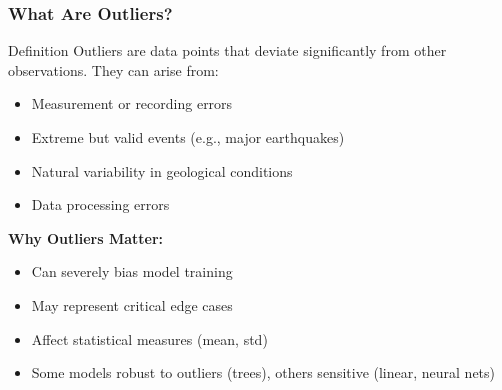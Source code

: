 \documentclass[aspectratio=169]{beamer}
\begin{document}
\begin{frame}
\frametitle{What Are Outliers?}

\begin{block}{Definition}
Outliers are data points that deviate significantly from other observations. They can arise from:
\begin{itemize}
    \item Measurement or recording errors
    \item Extreme but valid events (e.g., major earthquakes)
    \item Natural variability in geological conditions
    \item Data processing errors
\end{itemize}
\end{block}

\vspace{0.5cm}

\textbf{Why Outliers Matter:}
\begin{itemize}
    \item Can severely bias model training
    \item May represent critical edge cases
    \item Affect statistical measures (mean, std)
    \item Some models robust to outliers (trees), others sensitive (linear, neural nets)
\end{itemize}

\end{frame}
\end{document}
